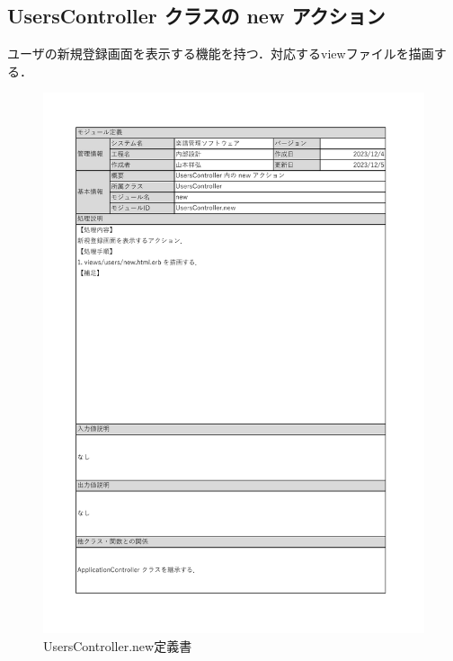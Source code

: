 \subsection*{UsersController クラスの new アクション}
ユーザの新規登録画面を表示する機能を持つ．対応するviewファイルを描画する．
\begin{figure}[H]
	\centering
	\includegraphics[scale=0.6]{img/Users/xlsx/UsersController_new.pdf}
	\vspace{-1cm}
	\caption{UsersController.new定義書}
\end{figure}
